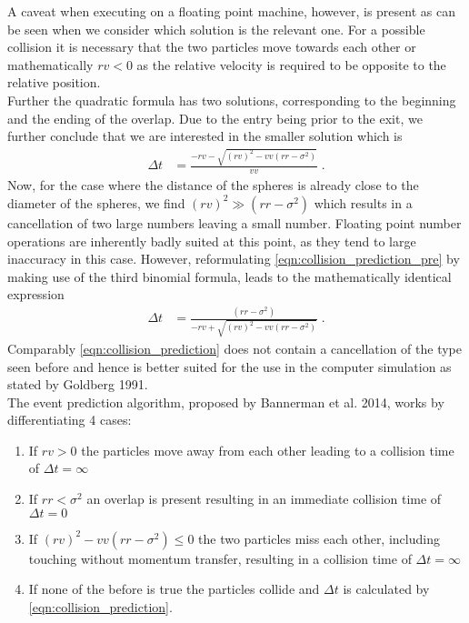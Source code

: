 A caveat when executing on a floating point machine, however, is present as can be seen when we consider which solution is the relevant one. For a possible collision it is necessary that the two particles move towards each other or mathematically $rv<0$ as the relative velocity is required to be opposite to the relative position.\\

Further the quadratic formula has two solutions, corresponding to the beginning and the ending of the overlap. Due to the entry being prior to the exit, we further conclude that we are interested in the smaller solution which is
\begin{align}
\label{eqn:collision_prediction_pre}
\Delta t &= \frac{ - rv - \sqrt{ (rv)^2  - vv (rr - \sigma^2 )} }{vv} \; \text{.}
\end{align}
Now, for the case where the distance of the spheres is already close to the diameter of the spheres, we find $(rv)^2 \gg (rr-\sigma^2)$ which results in a cancellation of two large numbers leaving a small number. Floating point number operations are inherently badly suited at this point, as they tend to large inaccuracy in this case. However, reformulating \autoref{eqn:collision_prediction_pre} by making use of the third binomial formula, leads to the mathematically identical expression
\begin{align}
\label{eqn:collision_prediction}
\Delta t &= \frac{(rr - \sigma^2 )}{ - rv + \sqrt{ (rv)^2  - vv (rr - \sigma^2 )}} \; \text{.}
\end{align}
Comparably \autoref{eqn:collision_prediction} does not contain a cancellation of the type seen before and hence is better suited for the use in the computer simulation as stated by Goldberg 1991\cite{Goldberg1991}.\\

The event prediction algorithm, proposed by Bannerman et al. 2014\cite{Bannerman2014}, works by differentiating 4 cases:
\begin{enumerate}
\item If $rv>0$ the particles move away from each other leading to a collision time of $\Delta t = \infty$
\item If $rr<\sigma^2$ an overlap is present resulting in an immediate collision time of $\Delta t = 0$
\item If $(rv)^2  - vv (rr - \sigma^2 ) \leq 0 $ the two particles miss each other, including touching without momentum transfer, resulting in a collision time of $\Delta t = \infty$
\item If none of the before is true the particles collide and $\Delta t$ is calculated by \autoref{eqn:collision_prediction}.
\end{enumerate}

